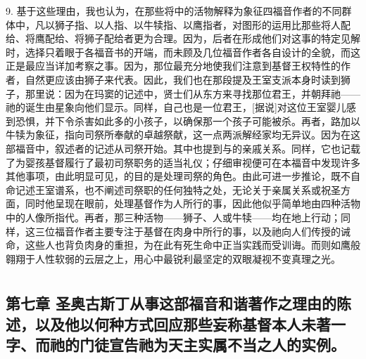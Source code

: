 9. 基于这些理由，我也认为，在那些将中的活物解释为象征四福音作者的不同群体中，凡以狮子指、以人指、以牛犊指、以鹰指者，对图形的运用比那些将人配给、将鹰配给、将狮子配给者更为合理。因为，后者在形成他们对这事的特定见解时，选择只着眼于各福音书的开端，而未顾及几位福音作者各自设计的全貌，而这正是最应当详加考察之事。因为，那位最充分地使我们注意到基督王权特性的作者，自然更应该由狮子来代表。因此，我们也在那段提及王室支派本身时读到狮子，那里说：因为在玛窦的记述中，贤士们从东方来寻找那位君王，并朝拜祂——祂的诞生由星象向他们显示。同样，自己也是一位君王，[据说]对这位王室婴儿感到恐惧，并下令杀害如此多的小孩子，以确保那一个孩子可能被杀。再者，路加以牛犊为象征，指向司祭所奉献的卓越祭献，这一点两派解经家均无异议。因为在这部福音中，叙述者的记述从司祭开始。其中也提到与的亲戚关系。同样，它也记载了为婴孩基督履行了最初司祭职务的适当礼仪；仔细审视便可在本福音中发现许多其他事项，由此明显可见，的目的是处理司祭的角色。由此可进一步推论，既不自命记述王室谱系，也不阐述司祭职的任何独特之处，无论关于亲属关系或祝圣方面，同时他呈现在眼前，处理基督作为人所行的事，因此他似乎简单地由四种活物中的人像所指代。再者，那三种活物——狮子、人或牛犊——均在地上行动；同样，这三位福音作者主要专注于基督在肉身中所行的事，以及祂向人们传授的诫命，这些人也背负肉身的重担，为在此有死生命中正当实践而受训诲。而则如鹰般翱翔于人性软弱的云层之上，用心中最锐利最坚定的双眼凝视不变真理之光。\par



\section{}


\subsection{第七章 圣奥古斯丁从事这部福音和谐著作之理由的陈述，以及他以何种方式回应那些妄称基督本人未著一字、而祂的门徒宣告祂为天主实属不当之人的实例。}

